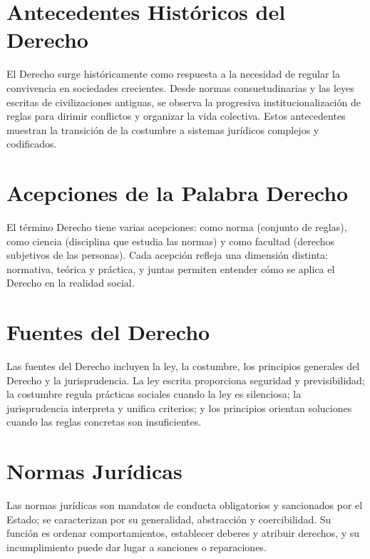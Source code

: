 \makeatletter
\graphicspath{{../investigacion-aplicada-a-la-contaduria/plantillas/}{../investigacion-aplicada-a-la-contaduria/}{./assets-actividades/}{./}}
\makeatother



\section{Antecedentes Históricos del Derecho}
El Derecho surge históricamente como respuesta a la necesidad de regular la convivencia en sociedades crecientes. Desde normas consuetudinarias y las leyes escritas de civilizaciones antiguas, se observa la progresiva institucionalización de reglas para dirimir conflictos y organizar la vida colectiva. Estos antecedentes muestran la transición de la costumbre a sistemas jurídicos complejos y codificados.

\section{Acepciones de la Palabra Derecho}
El término Derecho tiene varias acepciones: como norma (conjunto de reglas), como ciencia (disciplina que estudia las normas) y como facultad (derechos subjetivos de las personas). Cada acepción refleja una dimensión distinta: normativa, teórica y práctica, y juntas permiten entender cómo se aplica el Derecho en la realidad social.

\section{Fuentes del Derecho}
Las fuentes del Derecho incluyen la ley, la costumbre, los principios generales del Derecho y la jurisprudencia. La ley escrita proporciona seguridad y previsibilidad; la costumbre regula prácticas sociales cuando la ley es silenciosa; la jurisprudencia interpreta y unifica criterios; y los principios orientan soluciones cuando las reglas concretas son insuficientes.

\section{Normas Jurídicas}
Las normas jurídicas son mandatos de conducta obligatorios y sancionados por el Estado; se caracterizan por su generalidad, abstracción y coercibilidad. Su función es ordenar comportamientos, establecer deberes y atribuir derechos, y su incumplimiento puede dar lugar a sanciones o reparaciones.

